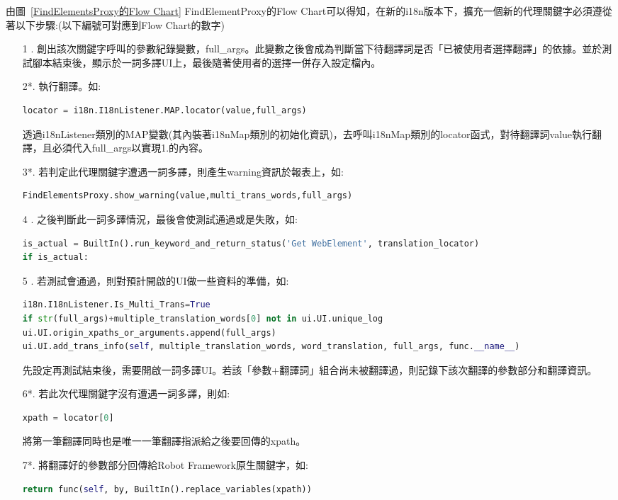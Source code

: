 由圖~\ref{FindElementsProxy的Flow Chart} FindElementProxy的Flow Chart可以得知，在新的i18n版本下，擴充一個新的代理關鍵字必須遵從著以下步驟:(以下編號可對應到Flow Chart的數字)
\begin{itemize}
\item[1 .]創出該次關鍵字呼叫的參數紀錄變數，full\_args。此變數之後會成為判斷當下待翻譯詞是否「已被使用者選擇翻譯」的依據。並於測試腳本結束後，顯示於一詞多譯UI上，最後隨著使用者的選擇一併存入設定檔內。

\item[2*.]執行翻譯。如:
\begin{lstlisting}[language={python}]
locator = i18n.I18nListener.MAP.locator(value,full_args)
\end{lstlisting}
透過i18nListener類別的MAP變數(其內裝著i18nMap類別的初始化資訊)，去呼叫i18nMap類別的locator函式，對待翻譯詞value執行翻譯，且必須代入full\_args以實現1.的內容。

\item[3*.]若判定此代理關鍵字遭遇一詞多譯，則產生warning資訊於報表上，如:
\begin{lstlisting}[language={python}]
FindElementsProxy.show_warning(value,multi_trans_words,full_args)
\end{lstlisting}

\item[4 .]之後判斷此一詞多譯情況，最後會使測試通過或是失敗，如:
\begin{lstlisting}[language={python}]
is_actual = BuiltIn().run_keyword_and_return_status('Get WebElement', translation_locator)
if is_actual:
\end{lstlisting}

\item[5 .]若測試會通過，則對預計開啟的UI做一些資料的準備，如:
\begin{lstlisting}[language={python}]
i18n.I18nListener.Is_Multi_Trans=True
if str(full_args)+multiple_translation_words[0] not in ui.UI.unique_log
ui.UI.origin_xpaths_or_arguments.append(full_args)
ui.UI.add_trans_info(self, multiple_translation_words, word_translation, full_args, func.__name__)
\end{lstlisting}
先設定再測試結束後，需要開啟一詞多譯UI。若該「參數+翻譯詞」組合尚未被翻譯過，則記錄下該次翻譯的參數部分和翻譯資訊。

\item[6*.]若此次代理關鍵字沒有遭遇一詞多譯，則如:
\begin{lstlisting}[language={python}]
xpath = locator[0]
\end{lstlisting}
將第一筆翻譯同時也是唯一一筆翻譯指派給之後要回傳的xpath。

\item[7*.]將翻譯好的參數部分回傳給Robot Framework原生關鍵字，如:
\begin{lstlisting}[language={python}]
return func(self, by, BuiltIn().replace_variables(xpath))
\end{lstlisting}
\end{itemize}

